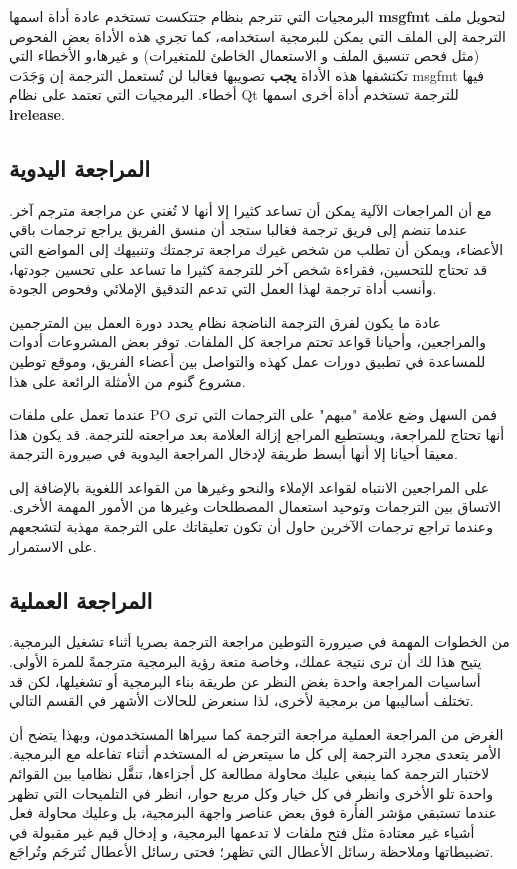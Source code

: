 البرمجيات التي تترجم بنظام جتتكست تستخدم عادة أداة اسمها {\bf msgfmt}
لتحويل ملف الترجمة إلى الملف التي يمكن للبرمجية استخدامه، كما تجري هذه
الأداة بعض الفحوص (مثل فحص تنسيق الملف و الاستعمال الخاطئ للمتغيرات) و
غيرها،و الأخطاء التي تكتشفها هذه الأداة {\bf يجب} تصويبها فغالبا لن
تُستعمل الترجمة إن وَجَدَت msgfmt فيها أخطاء. البرمجيات التي تعتمد على
نظام Qt للترجمة تستخدم أداة أخرى اسمها {\bf lrelease}.

\subsection{المراجعة اليدوية}
مع أن المراجعات الآلية يمكن أن
تساعد كثيرا إلا أنها لا تُغني عن مراجعة مترجم آخر. عندما تنضم إلى فريق
ترجمة فغالبا ستجد أن منسق الفريق يراجع ترجمات باقي الأعضاء، ويمكن أن
تطلب من شخص غيرك مراجعة ترجمتك وتنبيهك إلى المواضع التي قد تحتاج
للتحسين، فقراءة شخص آخر للترجمة كثيرا ما تساعد على تحسين جودتها، وأنسب
أداة ترجمة لهذا العمل التي تدعم التدقيق الإملائي وفحوص الجودة.

عادة ما يكون لفرق الترجمة الناضجة نظام يحدد دورة العمل بين المترجمين
والمراجعين، وأحيانا قواعد تحتم مراجعة كل الملفات. توفر بعض المشروعات
أدوات للمساعدة في تطبيق دورات عمل كهذه والتواصل بين أعضاء الفريق، وموقع
توطين مشروع گنوم من الأمثلة الرائعة على هذا.

عندما تعمل على ملفات PO فمن السهل وضع علامة "مبهم" على الترجمات التي ترى
أنها تحتاج للمراجعة، ويستطيع المراجع إزالة العلامة بعد مراجعته للترجمة.
قد يكون هذا معيقا أحيانا إلا أنها أبسط طريقة لإدخال المراجعة اليدوية في
صيرورة الترجمة.

على المراجعين الانتباه لقواعد الإملاء والنحو وغيرها من القواعد اللغوية
بالإضافة إلى الاتساق بين الترجمات وتوحيد استعمال المصطلحات وغيرها من
الأمور المهمة الأخرى. وعندما تراجع ترجمات الآخرين حاول أن تكون تعليقاتك
على الترجمة مهذبة لتشجعهم على الاستمرار.

\subsection{المراجعة العملية}
من الخطوات المهمة في صيرورة
التوطين مراجعة الترجمة بصريا أثناء تشغيل البرمجية. يتيح هذا لك أن ترى
نتيجة عملك، وخاصة متعة رؤية البرمجية مترجمةً للمرة الأولى. أساسيات
المراجعة واحدة بغض النظر عن طريقة بناء البرمجية أو تشغيلها، لكن قد
تختلف أساليبها من برمجية لأخرى، لذا سنعرض للحالات الأشهر في القسم
التالي.

الغرض من المراجعة العملية مراجعة الترجمة كما سيراها المستخدمون، وبهذا
يتضح أن الأمر يتعدى مجرد الترجمة إلى كل ما سيتعرض له المستخدم أثناء
تفاعله مع البرمجية. لاختبار الترجمة كما ينبغي عليك محاولة مطالعة كل
أجزاءها، تنقَّل نظاميا بين القوائم واحدة تلو الأخرى وانظر في كل خيار
وكل مربع حوار، انظر في التلميحات التي تظهر عندما تستبقي مؤشر الفأرة فوق
بعض عناصر واجهة البرمجية، بل وعليك محاولة فعل أشياء غير معتادة مثل فتح
ملفات لا تدعمها البرمجية، و إدخال قيم غير مقبولة في تضبيطاتها وملاحظة
رسائل الأعطال التي تظهر؛ فحتى رسائل الأعطال تُترجَم وتُراجَع.


